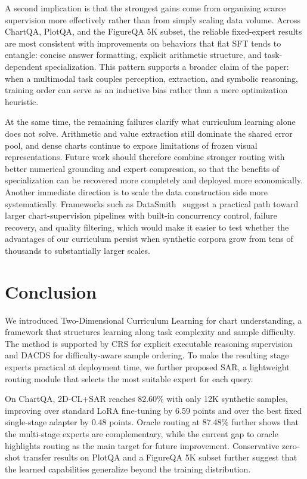 \documentclass[journal]{IEEEtran}
\newcommand{\method}{2D-CL}
\newcommand{\fullmethod}{Two-Dimensional Curriculum Learning}
\newcommand{\crs}{CRS}
\newcommand{\dacds}{DACDS}
\newcommand{\sar}{SAR}
\begin{document}
A second implication is that the strongest gains come from organizing scarce supervision more effectively rather than from simply scaling data volume.
Across ChartQA, PlotQA, and the FigureQA 5K subset, the reliable fixed-expert results are most consistent with improvements on behaviors that flat SFT tends to entangle: concise answer formatting, explicit arithmetic structure, and task-dependent specialization.
This pattern supports a broader claim of the paper: when a multimodal task couples perception, extraction, and symbolic reasoning, training order can serve as an inductive bias rather than a mere optimization heuristic.

At the same time, the remaining failures clarify what curriculum learning alone does not solve.
Arithmetic and value extraction still dominate the shared error pool, and dense charts continue to expose limitations of frozen visual representations.
Future work should therefore combine stronger routing with better numerical grounding and expert compression, so that the benefits of specialization can be recovered more completely and deployed more economically.
Another immediate direction is to scale the data construction side more systematically.
Frameworks such as DataSmith~\cite{datasmith2026} suggest a practical path toward larger chart-supervision pipelines with built-in concurrency control, failure recovery, and quality filtering, which would make it easier to test whether the advantages of our curriculum persist when synthetic corpora grow from tens of thousands to substantially larger scales.

\section{Conclusion}
We introduced \fullmethod{} for chart understanding, a framework that structures learning along task complexity and sample difficulty.
The method is supported by \crs{} for explicit executable reasoning supervision and \dacds{} for difficulty-aware sample ordering.
To make the resulting stage experts practical at deployment time, we further proposed \sar{}, a lightweight routing module that selects the most suitable expert for each query.

On ChartQA, \method{}+\sar{} reaches 82.60\% with only 12K synthetic samples, improving over standard LoRA fine-tuning by 6.59 points and over the best fixed single-stage adapter by 0.48 points.
Oracle routing at 87.48\% further shows that the multi-stage experts are complementary, while the current gap to oracle highlights routing as the main target for future improvement.
Conservative zero-shot transfer results on PlotQA and a FigureQA 5K subset further suggest that the learned capabilities generalize beyond the training distribution.
\end{document}
